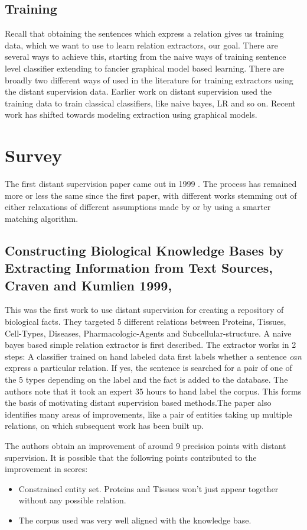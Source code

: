 \documentclass[a4paper,10pt]{article}
\begin{document}
\subsection{Training}
Recall that obtaining the sentences which express a relation gives us training data, which 
we want to use to learn relation extractors, our goal.
There are several ways to achieve this, starting from the naive ways of training sentence 
level classifier extending to fancier graphical model based learning.
There are broadly two different ways of used in the literature for training extractors using the distant supervision data.
Earlier work on distant supervision used the training data to train classical classifiers, like naive bayes, LR and so on.
Recent work has shifted towards modeling extraction using graphical models.
\section{Survey}

The first distant supervision paper came out in 1999 \cite{craven}. The process has remained more or less the same since the first paper, with 
different works stemming out of either relaxations of different assumptions made by \cite{craven} or by using a smarter matching algorithm.

\subsection{Constructing Biological Knowledge Bases by Extracting Information from Text Sources, Craven and Kumlien 1999, \cite{craven}}
This was the first work to use distant supervision for creating a repository of biological facts. 
They targeted 5 different relations between Proteins, Tissues, Cell-Types, Diseases, Pharmacologic-Agents and Subcellular-structure.
A naive bayes based simple relation extractor is first described. The extractor works in 2 steps:  A classifier trained on hand labeled data
first labels whether a sentence \emph{can} express a particular relation. If yes, the sentence is searched for a pair of one of the 5 types
depending on the label and the fact is added to the database.
The authors note that it took an expert 35 hours to hand label the corpus. This forms the basis of motivating distant supervision based 
methods.The paper also identifies many areas of improvements, like a pair of entities taking up multiple relations, on which subsequent work has been
built up.

The authors obtain an improvement of around 9 precision points with distant supervision.
It is possible that the following points contributed to the improvement in scores:
\begin{itemize}
 \item Constrained entity set. Proteins and Tissues won't just appear together without any possible relation. 
 \item The corpus used was very well aligned with the knowledge base.
\end{itemize}
\end{document}
